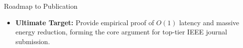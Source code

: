 \documentclass[t, aspectratio=169]{beamer}
\begin{document}
\begin{frame}{Roadmap to Publication}
\begin{center}
{\begin{tikzpicture}[node distance=0.5cm and 0.5cm]
		\end{tikzpicture}%
		}
		\end{center}
        
        \vspace{0.5em}
        \begin{itemize}
            \item \textbf{Ultimate Target:} Provide empirical proof of $O(1)$ latency and massive energy reduction, forming the core argument for top-tier IEEE journal submission.
        \end{itemize}
	\end{frame}

	\hustthankyou
	
\end{document}
